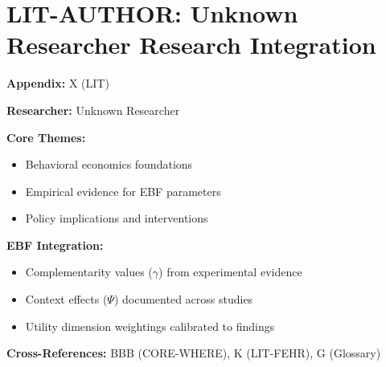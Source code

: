 %
%

\chapter{LIT-AUTHOR: Unknown Researcher Research Integration}
\label{app:x}

\begin{abstract}
This appendix integrates the research contributions of Unknown Researcher into the
Evidence-Based Framework. It documents key papers, core findings, and their
integration with EBF dimensions including complementarity parameters ($\gamma$),
context factors ($\Psi$), and utility dimensions.
\end{abstract}

\begin{tcolorbox}[colback=blue!5!white, colframe=blue!75!black,
    title=Quick Reference: Unknown Researcher Research]

\textbf{Appendix:} X (LIT)

\textbf{Researcher:} Unknown Researcher

\textbf{Core Themes:}
\begin{itemize}[nosep]
\item Behavioral economics foundations
\item Empirical evidence for EBF parameters
\item Policy implications and interventions
\end{itemize}

\textbf{EBF Integration:}
\begin{itemize}[nosep]
\item Complementarity values ($\gamma$) from experimental evidence
\item Context effects ($\Psi$) documented across studies
\item Utility dimension weightings calibrated to findings
\end{itemize}

\textbf{Cross-References:} BBB (CORE-WHERE), K (LIT-FEHR), G (Glossary)
\end{tcolorbox}


